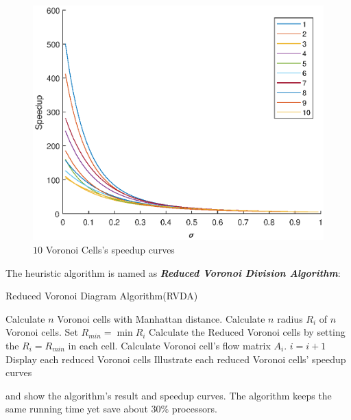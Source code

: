 \begin{figure}[!ht]
\centering
\includegraphics[width=1\columnwidth]{figure/voronoi_even_speedup.eps}
\caption{$10$ Voronoi Cells's speedup curves}
\label{fig:voronoi_even_speedup}
\end{figure}
\newpage 

The heuristic algorithm is named as \textbf{\textit{Reduced Voronoi Division Algorithm}}:

\begin{algorithm}
\caption{Reduced Voronoi Diagram Algorithm(RVDA)}
\begin{algorithmic} 

\renewcommand{\algorithmicrequire}{\textbf{Input: $n$ data injection position}}
\renewcommand{\algorithmicensure}{\textbf{Output: $n$ reduced Voronoi division}}

\STATE Calculate $n$ Voronoi cells with Manhattan distance.
\STATE Calculate $n$ radius $R_{i}$ of $n$ Voronoi cells.
\STATE Set $R_{min} = \min {R_{i}}$
\STATE Calculate the Reduced Voronoi cells by setting the $R_{i} = R_{min}$ in each cell.
\STATE Calculate Voronoi cell's flow matrix $A_{i}$.
\STATE $ i = i + 1$
\ENDWHILE
\STATE Display each reduced Voronoi cells
\STATE Illustrate each reduced Voronoi cells' speedup curves
\end{algorithmic}
\end{algorithm}
\newpage

 and  show the algorithm's result and speedup curves.  The algorithm keeps the same running time yet save about $30 \%$ processors.

